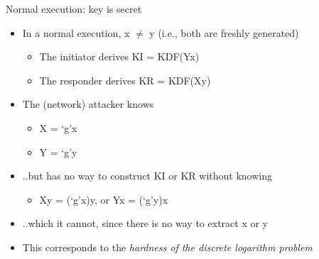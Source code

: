 \documentclass[11pt,aspectratio=169]{beamer}
\begin{document}
\begin{frame}[fragile]{Normal execution: key is secret}
    \begin{itemize}
        \item In a normal execution, \textcolor{TermBlue}{x $\neq$ y} (i.e., 
              both are freshly generated)
        \begin{itemize}
            \item The initiator derives \textcolor{TermBlue}{KI = KDF(Y\pow{}x)}
            \item The responder derives \textcolor{TermBlue}{KR = KDF(X\pow{}y)}
        \end{itemize}
        \item The (network) attacker knows
        \begin{itemize}
            \item \textcolor{TermBlue}{X = `g'\pow{}x}
            \item \textcolor{TermBlue}{Y = `g'\pow{}y}
        \end{itemize}
        \item ..but has no way to construct KI or KR without knowing
        \begin{itemize}
            \item \textcolor{TermBlue}{X\pow{}y = (`g'\pow{}x)\pow{}y}, or
                  \textcolor{TermBlue}{Y\pow{}x = (`g'\pow{}y)\pow{}x}
        \end{itemize}
        \item ..which it cannot, since there is no way to extract
              \textcolor{TermBlue}{x} or \textcolor{TermBlue}{y}
        \item This corresponds to the \textit{hardness of the discrete 
              logarithm problem}
    \end{itemize}
\end{frame}
\end{document}
